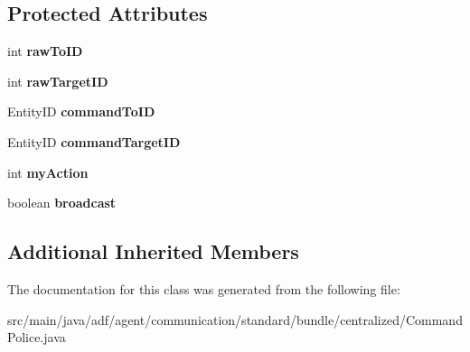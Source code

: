 \subsection*{Protected Attributes}
\begin{DoxyCompactItemize}
\item 
\hypertarget{classadf_1_1agent_1_1communication_1_1standard_1_1bundle_1_1centralized_1_1CommandPolice_ae8c679d636a28ae546a9f4181ddf6100}{}\label{classadf_1_1agent_1_1communication_1_1standard_1_1bundle_1_1centralized_1_1CommandPolice_ae8c679d636a28ae546a9f4181ddf6100} 
int {\bfseries raw\+To\+ID}
\item 
\hypertarget{classadf_1_1agent_1_1communication_1_1standard_1_1bundle_1_1centralized_1_1CommandPolice_aae55db1875805499e98740b6d38d5ed3}{}\label{classadf_1_1agent_1_1communication_1_1standard_1_1bundle_1_1centralized_1_1CommandPolice_aae55db1875805499e98740b6d38d5ed3} 
int {\bfseries raw\+Target\+ID}
\item 
\hypertarget{classadf_1_1agent_1_1communication_1_1standard_1_1bundle_1_1centralized_1_1CommandPolice_a0c1b7caf001436ad3ba26c4913c63a46}{}\label{classadf_1_1agent_1_1communication_1_1standard_1_1bundle_1_1centralized_1_1CommandPolice_a0c1b7caf001436ad3ba26c4913c63a46} 
Entity\+ID {\bfseries command\+To\+ID}
\item 
\hypertarget{classadf_1_1agent_1_1communication_1_1standard_1_1bundle_1_1centralized_1_1CommandPolice_ae0925f1844cdb9a019c309b3972fa399}{}\label{classadf_1_1agent_1_1communication_1_1standard_1_1bundle_1_1centralized_1_1CommandPolice_ae0925f1844cdb9a019c309b3972fa399} 
Entity\+ID {\bfseries command\+Target\+ID}
\item 
\hypertarget{classadf_1_1agent_1_1communication_1_1standard_1_1bundle_1_1centralized_1_1CommandPolice_ac4959c130aef15079efd18fc62d03bba}{}\label{classadf_1_1agent_1_1communication_1_1standard_1_1bundle_1_1centralized_1_1CommandPolice_ac4959c130aef15079efd18fc62d03bba} 
int {\bfseries my\+Action}
\item 
\hypertarget{classadf_1_1agent_1_1communication_1_1standard_1_1bundle_1_1centralized_1_1CommandPolice_a5c5bec5e7a73480cefa5cb83524db8ff}{}\label{classadf_1_1agent_1_1communication_1_1standard_1_1bundle_1_1centralized_1_1CommandPolice_a5c5bec5e7a73480cefa5cb83524db8ff} 
boolean {\bfseries broadcast}
\end{DoxyCompactItemize}
\subsection*{Additional Inherited Members}


The documentation for this class was generated from the following file\+:\begin{DoxyCompactItemize}
\item 
src/main/java/adf/agent/communication/standard/bundle/centralized/Command\+Police.\+java\end{DoxyCompactItemize}
